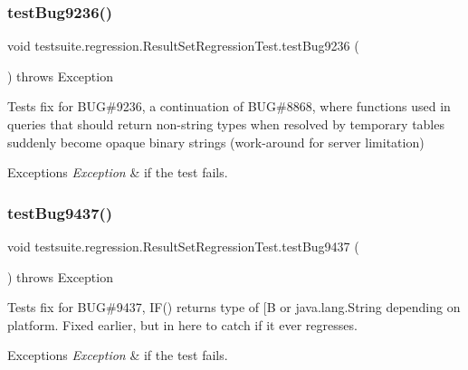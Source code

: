 \subsubsection{\texorpdfstring{test\+Bug9236()}{testBug9236()}}
{\footnotesize\ttfamily void testsuite.\+regression.\+Result\+Set\+Regression\+Test.\+test\+Bug9236 (\begin{DoxyParamCaption}{ }\end{DoxyParamCaption}) throws Exception}

Tests fix for B\+UG\#9236, a continuation of B\+UG\#8868, where functions used in queries that should return non-\/string types when resolved by temporary tables suddenly become opaque binary strings (work-\/around for server limitation)


\begin{DoxyExceptions}{Exceptions}
{\em Exception} & if the test fails. \\
\hline
\end{DoxyExceptions}
\mbox{\label{classtestsuite_1_1regression_1_1_result_set_regression_test_aa1115212e57fbb7e7c76c150db7d5ff5}} 
\subsubsection{\texorpdfstring{test\+Bug9437()}{testBug9437()}}
{\footnotesize\ttfamily void testsuite.\+regression.\+Result\+Set\+Regression\+Test.\+test\+Bug9437 (\begin{DoxyParamCaption}{ }\end{DoxyParamCaption}) throws Exception}

Tests fix for B\+UG\#9437, I\+F() returns type of \mbox{[}B or java.\+lang.\+String depending on platform. Fixed earlier, but in here to catch if it ever regresses.


\begin{DoxyExceptions}{Exceptions}
{\em Exception} & if the test fails. \\
\hline
\end{DoxyExceptions}
\mbox{\label{classtestsuite_1_1regression_1_1_result_set_regression_test_a8ba4d015c272ce27729cbff91f0e6b79}} 
